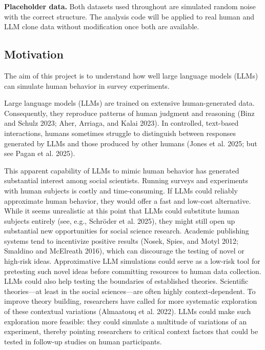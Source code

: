 \documentclass[
  letterpaper,
  DIV=11,
  numbers=noendperiod]{scrartcl}
\begin{document}
\begin{tcolorbox}[enhanced jigsaw, left=2mm, rightrule=.15mm, titlerule=0mm, colframe=quarto-callout-important-color-frame, opacitybacktitle=0.6, colback=white, opacityback=0, breakable, bottomtitle=1mm, coltitle=black, leftrule=.75mm, arc=.35mm, toprule=.15mm, title=\textcolor{quarto-callout-important-color}{\faExclamation}\hspace{0.5em}{Important}, colbacktitle=quarto-callout-important-color!10!white, bottomrule=.15mm, toptitle=1mm]

\textbf{Placeholder data.} Both datasets used throughout are simulated
random noise with the correct structure. The analysis code will be
applied to real human and LLM clone data without modification once both
are available.

\end{tcolorbox}

\subsection{Motivation}\label{motivation}

The aim of this project is to understand how well large language models
(LLMs) can simulate human behavior in survey experiments.

Large language models (LLMs) are trained on extensive human-generated
data. Consequently, they reproduce patterns of human judgment and
reasoning (Binz and Schulz 2023; Aher, Arriaga, and Kalai 2023). In
controlled, text-based interactions, humans sometimes struggle to
distinguish between responses generated by LLMs and those produced by
other humans (Jones et al. 2025; but see Pagan et al. 2025).

This apparent capability of LLMs to mimic human behavior has generated
substantial interest among social scientists. Running surveys and
experiments with human subjects is costly and time-consuming. If LLMs
could reliably approximate human behavior, they would offer a fast and
low-cost alternative. While it seems unrealistic at this point that LLMs
could substitute human subjects entirely (see, e.g., Schröder et al.
2025), they might still open up substantial new opportunities for social
science research. Academic publishing systems tend to incentivize
positive results (Nosek, Spies, and Motyl 2012; Smaldino and McElreath
2016), which can discourage the testing of novel or high-risk ideas.
Approximative LLM simulations could serve as a low-risk tool for
pretesting such novel ideas before committing resources to human data
collection. LLMs could also help testing the boundaries of established
theories. Scientific theories---at least in the social sciences---are
often highly context-dependent. To improve theory building, researchers
have called for more systematic exploration of these contextual
variations (Almaatouq et al. 2022). LLMs could make such exploration
more feasible: they could simulate a multitude of variations of an
experiment, thereby pointing researchers to critical context factors
that could be tested in follow-up studies on human participants.
\end{document}
